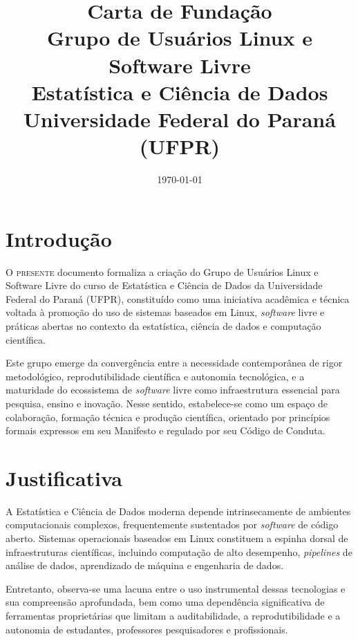 \documentclass[
  12pt,          %
  a4paper,       %
  oneside,       %
  brazil         %
]{article}
\title{Carta de Fundação\\[0.3em]
  \Large\mdseries\color{gulecdGray}%
  Grupo de Usuários Linux e Software Livre\\Estatística e Ciência de Dados\\Universidade Federal do Paraná (UFPR)}
\date{\today}
\begin{document}
\thispagestyle{empty}
\maketitle

\newpage

\section{Introdução}

\lettrine[lines=3, lhang=0.1, nindent=0em, slope=-0.5em]{O}{ presente} documento formaliza a criação do Grupo de Usuários Linux e Software Livre do curso de  
Estatística e Ciência de Dados da Universidade Federal do Paraná (UFPR), constituído como uma iniciativa acadêmica e técnica voltada à promoção do 
uso de sistemas baseados em Linux, \textit{software} livre e práticas abertas no contexto da estatística, ciência de dados e computação científica.

Este grupo emerge da convergência entre a necessidade contemporânea de rigor metodológico, reprodutibilidade científica e autonomia tecnológica, e a 
maturidade do ecossistema de \textit{software} livre como infraestrutura essencial para pesquisa, ensino e inovação. Nesse sentido, estabelece-se como um 
espaço de colaboração, formação técnica e produção científica, orientado por princípios formais expressos em seu Manifesto e regulado por seu Código de Conduta.

\section{Justificativa}

A Estatística e Ciência de Dados moderna depende intrinsecamente de ambientes computacionais complexos, frequentemente sustentados por \textit{software} 
de código aberto. Sistemas operacionais baseados em Linux constituem a espinha dorsal de infraestruturas científicas, incluindo computação de alto desempenho, 
\textit{pipelines} de análise de dados, aprendizado de máquina e engenharia de dados.

Entretanto, observa-se uma lacuna entre o uso instrumental dessas tecnologias e sua compreensão aprofundada, 
bem como uma dependência significativa de ferramentas proprietárias que limitam a auditabilidade, a reprodutibilidade e a autonomia de estudantes, professores
pesquisadores e profissionais.
\end{document}
